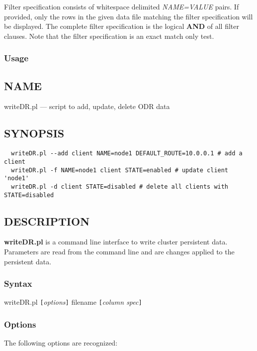 Filter specification consists of whitespace delimited {\em NAME=VALUE\/} pairs. If provided,
only the rows in the given data file matching the filter specification will be displayed.
The complete filter specification is the logical {\bf AND} of all filter clauses. Note
that the filter specification is an exact match only test.

\subsubsection{ Usage}

\subsection*{NAME}
writeDR.pl --- script to add, update, delete ODR data

\subsection*{SYNOPSIS}\begin{verbatim}
  writeDR.pl --add client NAME=node1 DEFAULT_ROUTE=10.0.0.1 # add a client
  writeDR.pl -f NAME=node1 client STATE=enabled # update client 'node1'
  writeDR.pl -d client STATE=disabled # delete all clients with STATE=disabled
\end{verbatim}

\subsection*{DESCRIPTION}
{\bf writeDR.pl} is a command line interface to write cluster persistent data.
Parameters are read from the command line and are changes applied to the
persistent data.

\subsubsection*{Syntax}%

writeDR.pl {\tt [}{\em options\/}{\tt ]} filename {\tt [}{\em column spec\/}{\tt ]}

\subsubsection*{Options}%

The following options are recognized:

